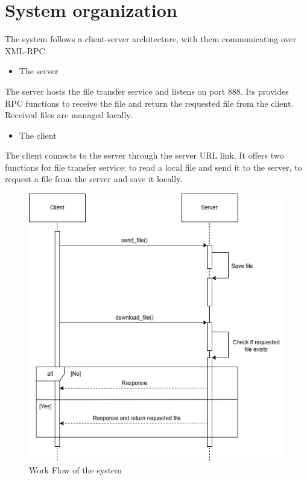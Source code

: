 \documentclass[12pt]{article}
\begin{document}
\section{System organization}
The system follows a client-server architecture, with them communicating over XML-RPC.

\begin{itemize}
    \item The server
\end{itemize}
The server hosts the file transfer service and listens on port 888. Its provides RPC functions to receive the file and return the requested file from the client. Received files are managed locally.

\begin{itemize}
    \item The client
\end{itemize}
The client connects to the server through the server URL link. It offers two functions for file transfer service: to read a local file and send it to the server, to request a file from the server and save it locally.

\newpage

\begin{figure}[!ht]
\centering
\includegraphics[scale=0.5]{work-flow.png}
\caption{Work Flow of the system}
\end{figure}
\end{document}
